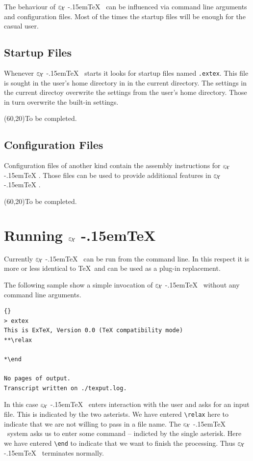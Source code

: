 \documentclass[12pt,div12,a4paper]{scrbook}
\providecommand*{\ExTeX}{\ifx\texorpdfstring\undefined
  \textrm{%
    \ensuremath{\textstyle\varepsilon_{\kern-0.15em\mathcal{X}}}%
    \kern-.15em\TeX}%
  \else\texorpdfstring{%
  \textrm{%
    \ensuremath{\textstyle\varepsilon_{\kern-0.15em\mathcal{X}}}%
    \kern-.15em\TeX
  }}{ExTeX}%
  \fi
}
\newcommand\INCOMPLETE{\bigskip\par{\unitlength=1mm\framebox(60,20){To be completed.}}\bigskip\par}
\begin{document}
The behaviour of \ExTeX\ can be influenced via command line arguments
and configuration files. Most of the times the startup files will be
enough for the casual user.


\section{Startup Files}

Whenever \ExTeX\ starts it looks for startup files named
\texttt{.extex}. This file is sought in the user's home directory in
in the current directory. The settings in the current directoy
overwrite the settings from the user's home directory. Those in turn
overwrite the built-in settings.

\INCOMPLETE

\section{Configuration Files}

Configuration files of another kind contain the assembly instructions
for \ExTeX. Those files can be used to provide additional features in
\ExTeX. 

\INCOMPLETE

\chapter{Running \ExTeX}

Currently \ExTeX\ can be run from the command line. In this respect it
is more or less identical to \TeX\ and can be used as a plug-in
replacement.

The following sample show a simple invocation of \ExTeX\ without any
command line arguments.

\begin{lstlisting}{}
> extex
This is ExTeX, Version 0.0 (TeX compatibility mode)
**\relax

*\end

No pages of output.
Transcript written on ./texput.log.
\end{lstlisting}

In this case \ExTeX\ enters interaction with the user and asks for an
input file. This is indicated by the two asterists. We have entered
\verb|\relax| here to indicate that we are not willing to pass in a
file name. The \ExTeX\ system asks us to enter some command --
indicted by the single asterisk. Here we have entered \verb|\end| to
indicate that we want to finish the processing. Thus \ExTeX\
terminates normally.
\end{document}
